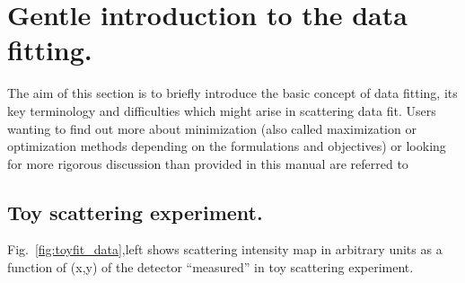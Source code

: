 %
\section{Gentle introduction to the data fitting.} 

The aim of this section is to briefly introduce the basic concept of
data fitting, its key terminology and difficulties which might arise in scattering data fit.
Users wanting to find out more about minimization (also called
maximization or optimization methods depending on the formulations and objectives) 
or looking for more rigorous discussion than provided in this manual
are referred to \cite{Antoniou2007, mntutorial}

\subsection{Toy scattering experiment.}

Fig.~\ref{fig:toyfit_data},left shows scattering intensity map in arbitrary units  
as a function of (x,y) of the detector ``measured'' in toy scattering experiment.

